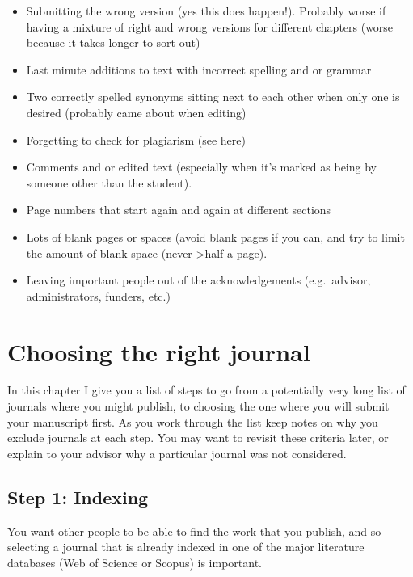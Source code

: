 \documentclass[
]{krantz}
\providecommand{\tightlist}{%
  \setlength{\itemsep}{0pt}\setlength{\parskip}{0pt}}
\begin{document}
\begin{itemize}
\tightlist
\item
  Submitting the wrong version (yes this does happen!). Probably worse if having a mixture of right and wrong versions for different chapters (worse because it takes longer to sort out)
\item
  Last minute additions to text with incorrect spelling and or grammar
\item
  Two correctly spelled synonyms sitting next to each other when only one is desired (probably came about when editing)
\item
  Forgetting to check for plagiarism (see here)
\item
  Comments and or edited text (especially when it's marked as being by someone other than the student).
\item
  Page numbers that start again and again at different sections
\item
  Lots of blank pages or spaces (avoid blank pages if you can, and try to limit the amount of blank space (never \textgreater half a page).
\item
  Leaving important people out of the acknowledgements (e.g.~advisor, administrators, funders, etc.)
\end{itemize}

\hypertarget{whichjournal}{%
\chapter{Choosing the right journal}\label{whichjournal}}

In this chapter I give you a list of steps to go from a potentially very long list of journals where you might publish, to choosing the one where you will submit your manuscript first. As you work through the list keep notes on why you exclude journals at each step. You may want to revisit these criteria later, or explain to your advisor why a particular journal was not considered.

\hypertarget{step-1-indexing}{%
\section{Step 1: Indexing}\label{step-1-indexing}}

You want other people to be able to find the work that you publish, and so selecting a journal that is already indexed in one of the major literature databases (Web of Science or Scopus) is important.
\end{document}
